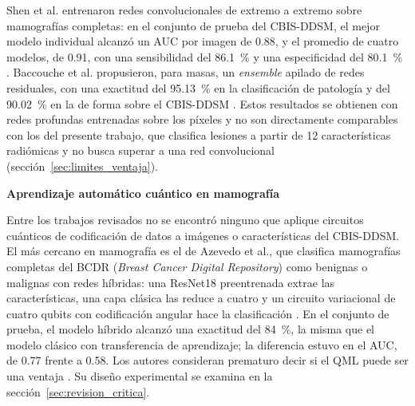 Shen et al. entrenaron redes convolucionales de extremo a extremo sobre mamografías completas: en el conjunto de prueba del CBIS-DDSM, el mejor modelo individual alcanzó un AUC por imagen de 0.88, y el promedio de cuatro modelos, de 0.91, con una sensibilidad del 86.1~\% y una especificidad del 80.1~\% \cite{Shen2019DeepLearning}.
Baccouche et al. propusieron, para masas, un \textit{ensemble} apilado de redes residuales, con una exactitud del 95.13~\% en la clasificación de patología y del 90.02~\% en la de forma sobre el CBIS-DDSM \cite{Baccouche2022ResidualNN}.
Estos resultados se obtienen con redes profundas entrenadas sobre los píxeles y no son directamente comparables con los del presente trabajo, que clasifica lesiones a partir de 12 características radiómicas y no busca superar a una red convolucional (sección~\ref{sec:limites_ventaja}).

\textbf{Aprendizaje automático cuántico en mamografía}

Entre los trabajos revisados no se encontró ninguno que aplique circuitos cuánticos de codificación de datos a imágenes o características del CBIS-DDSM.
El más cercano en mamografía es el de Azevedo et al., que clasifica mamografías completas del BCDR (\textit{Breast Cancer Digital Repository}) como benignas o malignas con redes híbridas: una ResNet18 preentrenada extrae las características, una capa clásica las reduce a cuatro y un circuito variacional de cuatro qubits con codificación angular hace la clasificación \cite{Azevedo2022QuantumTransfer}.
En el conjunto de prueba, el modelo híbrido alcanzó una exactitud del 84~\%, la misma que el modelo clásico con transferencia de aprendizaje; la diferencia estuvo en el AUC, de 0.77 frente a 0.58. Los autores consideran prematuro decir si el QML puede ser una ventaja \cite{Azevedo2022QuantumTransfer}. Su diseño experimental se examina en la sección~\ref{sec:revision_critica}.

